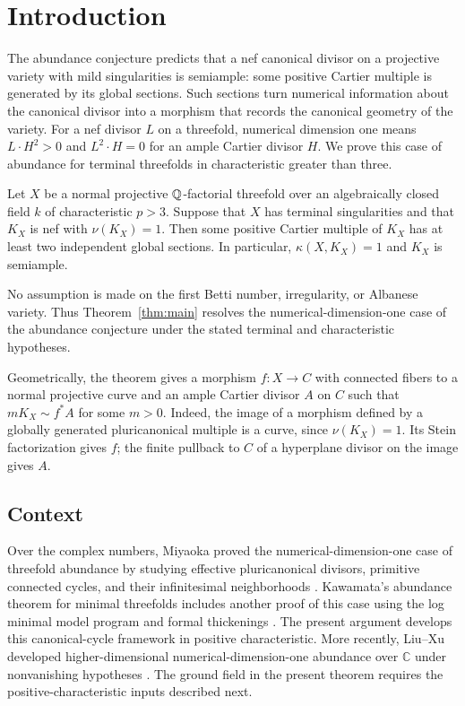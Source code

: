 \section{Introduction}
\label{sec:introduction}

The abundance conjecture predicts that a nef canonical divisor on a
projective variety with mild singularities is semiample: some positive
Cartier multiple is generated by its global sections.  Such sections
turn numerical information about the canonical divisor into a morphism
that records the canonical geometry of the variety.  For a nef divisor
$L$ on a threefold, numerical dimension one means
$L\cdot H^2>0$ and $L^2\cdot H=0$ for an ample Cartier divisor $H$.
We prove this case of abundance for terminal threefolds in
characteristic greater than three.

\begin{theorem}\label{thm:main}
Let $X$ be a normal projective $\mathbb Q$-factorial threefold over an
algebraically closed field $k$ of characteristic $p>3$.  Suppose that
$X$ has terminal singularities and that $K_X$ is nef with
$\nu(K_X)=1$.  Then some positive Cartier multiple of $K_X$ has at
least two independent global sections.  In particular,
$\kappa(X,K_X)=1$ and $K_X$ is semiample.
\end{theorem}

No assumption is made on the first Betti number, irregularity,
or Albanese variety.  Thus Theorem~\ref{thm:main} resolves the
numerical-dimension-one case of the abundance conjecture under the
stated terminal and characteristic hypotheses.

Geometrically, the theorem gives a morphism $f:X\to C$ with connected
fibers to a normal projective curve and an ample Cartier divisor $A$
on $C$ such that $mK_X\sim f^*A$ for some $m>0$.  Indeed, the image
of a morphism defined by a globally generated pluricanonical multiple
is a curve, since $\nu(K_X)=1$.  Its Stein factorization gives $f$;
the finite pullback to $C$ of a hyperplane divisor on the image gives $A$.

\subsection{Context}

Over the complex numbers, Miyaoka proved the numerical-dimension-one
case of threefold abundance by studying effective pluricanonical
divisors, primitive connected cycles, and their infinitesimal
neighborhoods \cite{miyaoka1988}.  Kawamata's abundance theorem for
minimal threefolds includes another proof of this case using the log
minimal model program and formal thickenings
\cite[Section~4]{kawamata1992}.  The present argument develops this
canonical-cycle framework in positive characteristic.
More recently, Liu--Xu developed higher-dimensional
numerical-dimension-one abundance over $\mathbb C$ under nonvanishing
hypotheses \cite{liuxu2025}.  The ground field in the present theorem
requires the positive-characteristic inputs described next.

